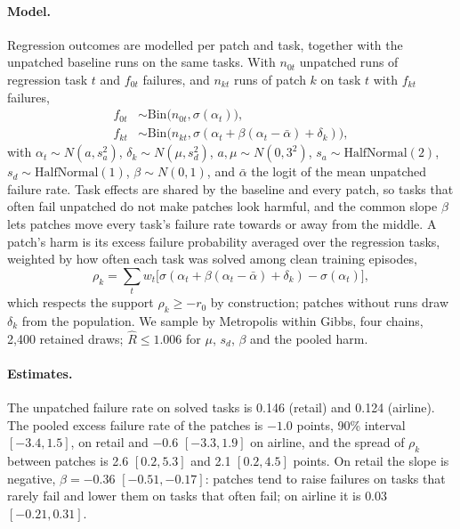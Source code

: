 \documentclass[11pt]{article}
\begin{document}
\paragraph{Model.} Regression outcomes are modelled per patch and task, together with the unpatched baseline runs on the same tasks. With $n_{0t}$ unpatched runs of regression task $t$ and $f_{0t}$ failures, and $n_{kt}$ runs of patch $k$ on task $t$ with $f_{kt}$ failures,
\begin{align*}
f_{0t}&\sim\mathrm{Bin}\big(n_{0t},\sigma(\alpha_t)\big),\\
f_{kt}&\sim\mathrm{Bin}\big(n_{kt},\sigma(\alpha_t+\beta(\alpha_t-\bar\alpha)+\delta_k)\big),
\end{align*}
with $\alpha_t\sim N(a,s_a^2)$, $\delta_k\sim N(\mu,s_d^2)$, $a,\mu\sim N(0,3^2)$, $s_a\sim\mathrm{HalfNormal}(2)$, $s_d\sim\mathrm{HalfNormal}(1)$, $\beta\sim N(0,1)$, and $\bar\alpha$ the logit of the mean unpatched failure rate. Task effects are shared by the baseline and every patch, so tasks that often fail unpatched do not make patches look harmful, and the common slope $\beta$ lets patches move every task's failure rate towards or away from the middle. A patch's harm is its excess failure probability averaged over the regression tasks, weighted by how often each task was solved among clean training episodes,
\[
\rho_k=\textstyle\sum_t w_t\big[\sigma(\alpha_t+\beta(\alpha_t-\bar\alpha)+\delta_k)-\sigma(\alpha_t)\big],
\]
which respects the support $\rho_k\ge-r_0$ by construction; patches without runs draw $\delta_k$ from the population. We sample by Metropolis within Gibbs, four chains, 2{,}400 retained draws; $\hat R\le1.006$ for $\mu$, $s_d$, $\beta$ and the pooled harm.

\paragraph{Estimates.} The unpatched failure rate on solved tasks is 0.146 (retail) and 0.124 (airline). The pooled excess failure rate of the patches is $-1.0$ points, 90\% interval $[-3.4,1.5]$, on retail and $-0.6$ $[-3.3,1.9]$ on airline, and the spread of $\rho_k$ between patches is 2.6 $[0.2,5.3]$ and 2.1 $[0.2,4.5]$ points. On retail the slope is negative, $\beta=-0.36$ $[-0.51,-0.17]$: patches tend to raise failures on tasks that rarely fail and lower them on tasks that often fail; on airline it is $0.03$ $[-0.21,0.31]$.
\end{document}
